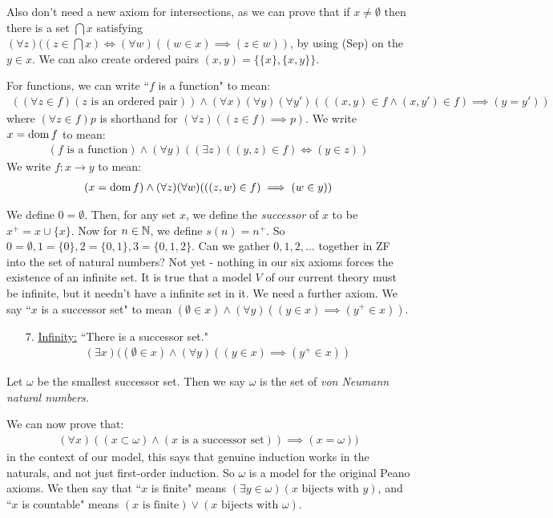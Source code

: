 \documentclass[10pt,a4paper]{article}
\begin{document}
Also don't need a new axiom for intersections, as we can prove that if $x \neq \emptyset$ then there is a set $\bigcap x$ satisfying $(\forall z)((z \in \bigcap x) \iff (\forall w)((w \in x)\implies(z \in w))$, by using (Sep) on the $y \in x$. We can also create ordered pairs $(x,y) = \{\{x\},\{x,y\}\}$.

For functions, we can write ``$f$ is a function" to mean:
\begin{align*}
((\forall z \in f)(z\text{ is an ordered pair}))\wedge (\forall x)(\forall y)(\forall y')(((x,y) \in f \wedge (x,y')\in f) \implies (y =y'))
\end{align*}
where $(\forall z\in f)p$ is shorthand for $(\forall z)((z \in f) \implies p)$. We write $x = \operatorname{dom} f$ to mean:
\begin{align*}
(f\text{ is a function})\wedge (\forall y)((\exists z)((y, z)\in f)\iff (y \in z))
\end{align*}
We write $f:x \to y$ to mean:
\begin{align*}
(x=\operatorname{dom} f)\wedge (\forall z)(\forall w)(((z,w )\in f) \implies (w \in y))
\end{align*}

We define $0 = \emptyset$. Then, for any set $x$, we define the \emph{successor} of $x$ to be $x^+ = x \cup \{x\}$. Now for $n \in \mathbb{N}$, we define $s(n)=n^+$. So $0 = \emptyset, 1 = \{0\}, 2 = \{0,1\}, 3 = \{0,1,2\}$. Can we gather $0,1,2,\ldots$ together in ZF into the set of natural numbers? Not yet - nothing in our six axioms forces the existence of an infinite set. It is true that a model $V$ of our current theory must be infinite, but it needn't have a infinite set in it. We need a further axiom. We say ``$x$ is a successor set" to mean $(\emptyset \in x) \wedge (\forall y)((y \in x)\implies (y^+ \in x))$.
\begin{enumerate}
\item[7.] \underline{Infinity:} ``There is a successor set."
\begin{align*}
(\exists x)((\emptyset \in x)\wedge(\forall y)((y \in x)\implies(y^+ \in x))\tag{Inf}
\end{align*}
\end{enumerate}
Let $\omega$ be the smallest successor set. Then we say $\omega$ is the set of \emph{von Neumann natural numbers.}

We can now prove that:
\begin{align*}
(\forall x)((x \subset \omega)\wedge(x\text{ is a successor set}))\implies(x = \omega))
\end{align*}
in the context of our model, this says that genuine induction works in the naturals, and not just first-order induction. So $\omega$ is a model for the original Peano axioms. We then say that ``$x$ is finite" means $(\exists y \in \omega)(x\text{ bijects with }y)$, and ``$x$ is countable" means $(x\text{ is finite})\vee(x\text{ bijects with }\omega)$.
\end{document}

